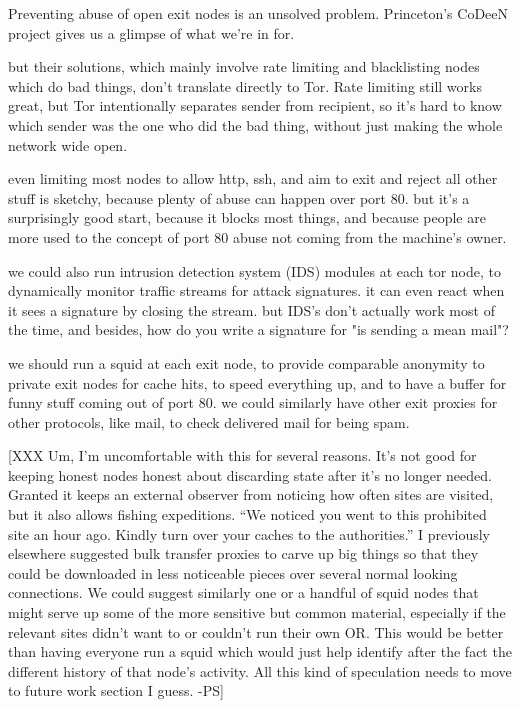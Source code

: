 \documentclass[times,10pt,twocolumn]{article}
\begin{document}
Preventing abuse of open exit nodes is an unsolved problem. Princeton's
CoDeeN project \cite{darkside} gives us a glimpse of what we're in for.

but their solutions, which mainly involve rate limiting and blacklisting
nodes which do bad things, don't translate directly to Tor. Rate limiting
still works great, but Tor intentionally separates sender from recipient,
so it's hard to know which sender was the one who did the bad thing,
without just making the whole network wide open.

even limiting most nodes to allow http, ssh, and aim to exit and reject
all other stuff is sketchy, because plenty of abuse can happen over
port 80. but it's a surprisingly good start, because it blocks most things,
and because people are more used to the concept of port 80 abuse not
coming from the machine's owner.

we could also run intrusion detection system (IDS) modules at each tor
node, to dynamically monitor traffic streams for attack signatures. it
can even react when it sees a signature by closing the stream. but IDS's
don't actually work most of the time, and besides, how do you write a
signature for "is sending a mean mail"?

we should run a squid at each exit node, to provide comparable anonymity
to private exit nodes for cache hits, to speed everything up, and to
have a buffer for funny stuff coming out of port 80. we could similarly
have other exit proxies for other protocols, like mail, to check
delivered mail for being spam.

[XXX Um, I'm uncomfortable with this for several reasons.
It's not good for keeping honest nodes honest about discarding
state after it's no longer needed. Granted it keeps an external
observer from noticing how often sites are visited, but it also
allows fishing expeditions. ``We noticed you went to this prohibited
site an hour ago. Kindly turn over your caches to the authorities.''
I previously elsewhere suggested bulk transfer proxies to carve
up big things so that they could be downloaded in less noticeable
pieces over several normal looking connections. We could suggest
similarly one or a handful of squid nodes that might serve up
some of the more sensitive but common material, especially if
the relevant sites didn't want to or couldn't run their own OR.
This would be better than having everyone run a squid which would
just help identify after the fact the different history of that
node's activity. All this kind of speculation needs to move to
future work section I guess. -PS]
\end{document}
